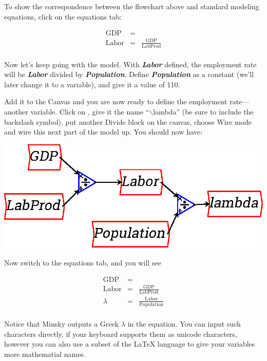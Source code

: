 To show the correspondence between the flowchart above and standard
modeling equations, click on the equations tab: 

\begin{eqnarray*}
\mathrm{GDP}&=&\\
\mathrm{Labor}&=&\frac{\mathrm{GDP}}{\mathrm{LabProd}}\\
\end{eqnarray*}

Now let's keep going with the model. With {\bf\em Labor} defined, the
employment rate will be {\bf\em  Labor} divided by {\bf\em
Population}. Define {\bf\em Population} as a constant (we'll later
change it to a variable), and give it a value of 110. 

\begin{center}
\end{center}

Add it to the Canvas and you are now ready to define the employment
rate---another variable. Click on , give it
the name ``$\backslash$lambda'' (be sure to include the backslash symbol), put
another Divide block on the canvas, choose Wire mode and wire this
next part of the model up. You should now have:

\begin{center}
\includegraphics{images/NewItem83.eps} 
\end{center}


Now switch to the equations tab, and you will see

\begin{eqnarray*}
\mathrm{GDP}&=&\\
\mathrm{Labor}&=&\frac{\mathrm{GDP}}{\mathrm{LabProd}}\\
\lambda&=&\frac{\mathrm{Labor}}{\mathrm{Population}}\\
\end{eqnarray*}

Notice that Minsky outputs a Greek $\lambda$ in the equation. You can
input such characters directly, if your keyboard supports them as unicode
characters, however you can also use a subset of the LaTeX language to give
your variables more mathematial names.



